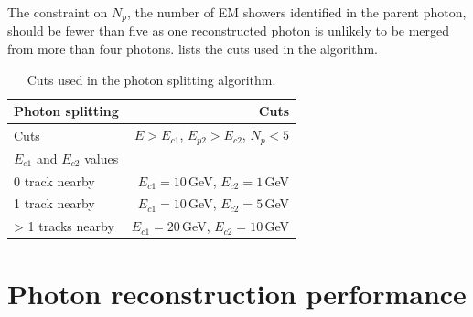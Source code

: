 
The constraint on $N_{p}$, the number of EM showers identified in the parent photon, should be fewer than five as one reconstructed photon is unlikely to be  merged from more than four photons.  lists the cuts used in the algorithm.



\begin{table}[htbp]
\centering
\smallskip
\begin{tabular}{l r }
\hline
\hline
Photon splitting&  Cuts\\
\hline
\multicolumn{1}{L{0.3\textwidth}}{Cuts} & \multicolumn{1}{R{0.6\textwidth}}{$E > E_{c1}$, $E_{p2} > E_{c2}$, $N_{p} < 5$} \\
\hline
$E_{c1}$ and $E_{c2}$ values &  \\
\hline
\multicolumn{1}{L{0.3\textwidth}}{0 track nearby} & \multicolumn{1}{R{0.6\textwidth}}{$E_{c1} = 10$\,GeV, $E_{c2} = 1$\,GeV} \\
\multicolumn{1}{L{0.3\textwidth}}{1 track nearby} & \multicolumn{1}{R{0.6\textwidth}}{$E_{c1} = 10$\,GeV, $E_{c2} = 5$\,GeV} \\
\multicolumn{1}{L{0.3\textwidth}}{> 1 tracks nearby} & \multicolumn{1}{R{0.6\textwidth}}{$E_{c1} = 20$\,GeV, $E_{c2} = 10$\,GeV} \\
\hline
\hline
\end{tabular}

\caption[Cuts for splitting photons.]%
{Cuts used in the photon splitting algorithm. }
\label{tab:photonPhotonSplitting}
\end{table}


\section{Photon reconstruction performance}


